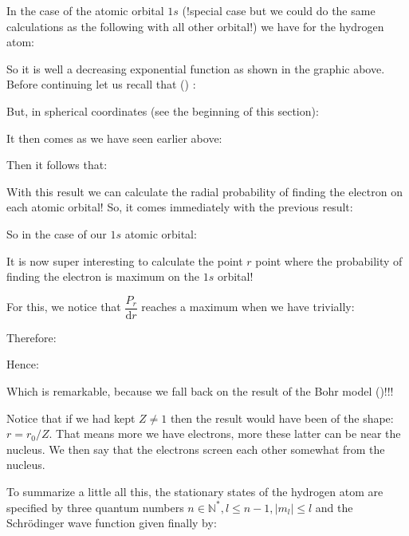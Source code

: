 	In the case of the atomic orbital $1s$ (!special case but we could do the same calculations as the following with all other orbital!) we have for the hydrogen atom:
	
	So it is well a decreasing exponential function as shown in the graphic above. Before continuing let us recall that () :
	
	But, in spherical coordinates (see the beginning of this section):
	
	It then comes as we have seen earlier above:
	
	Then it follows that:
	
	With this result we can calculate the radial probability of finding the electron on each atomic orbital! So, it comes immediately with the previous result:
	
	So in the case of our $1s$ atomic orbital:
	
	It is now super interesting to calculate the point $r$ point where the probability of finding the electron is maximum on the $1s$ orbital!

	For this, we notice that $\dfrac{P_r}{\mathrm{d}r}$ reaches a maximum when we have trivially:
	
	Therefore:
	
	Hence:
	
	Which is remarkable, because we fall back on the result of the Bohr model ()!!!
	
	\begin{tcolorbox}[title=Remark,arc=10pt,breakable,drop lifted shadow,
  skin=enhanced,
  skin first is subskin of={enhancedfirst}{arc=10pt,no shadow},
  skin middle is subskin of={enhancedmiddle}{arc=10pt,no shadow},
  skin last is subskin of={enhancedlast}{drop lifted shadow}]
	Notice that if we had kept $Z\neq 1$ then the result would have been of the shape: $r=r_0/Z$. That means more we have electrons, more these latter can be near the nucleus. We then say that the electrons screen each other somewhat from the nucleus.\label{electron screening}
	\end{tcolorbox}

	To summarize a little all this, the stationary states of the hydrogen atom are specified by three quantum numbers $n\in\mathbb{N}^{*},l\leq n-1,|m_l|\leq l$ and the Schrödinger wave function given finally by:
	
